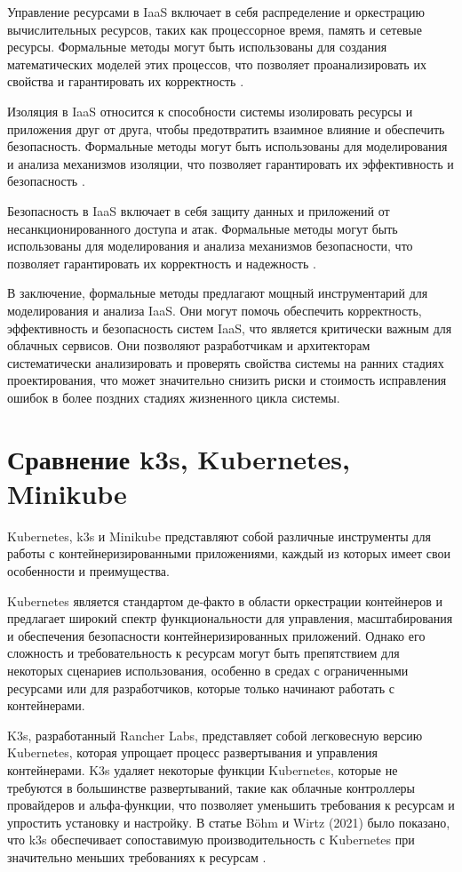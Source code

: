 Управление ресурсами в IaaS включает в себя распределение и
оркестрацию вычислительных ресурсов, таких как процессорное время,
память и сетевые ресурсы. Формальные методы могут быть использованы
для создания математических моделей этих процессов, что позволяет
проанализировать их свойства и гарантировать их корректность
\cite{de2012formal, turin2023predicting}.

Изоляция в IaaS относится к способности системы изолировать ресурсы и
приложения друг от друга, чтобы предотвратить взаимное влияние и
обеспечить безопасность. Формальные методы могут быть использованы
для моделирования и анализа механизмов изоляции, что позволяет
гарантировать их эффективность и безопасность \cite{bijon2014formal}.

Безопасность в IaaS включает в себя защиту данных и приложений от
несанкционированного доступа и атак. Формальные методы могут быть
использованы для моделирования и анализа механизмов безопасности,
что позволяет гарантировать их корректность и надежность
\cite{amato2018improving}.

В заключение, формальные методы предлагают мощный инструментарий для
моделирования и анализа IaaS. Они могут помочь обеспечить корректность,
эффективность и безопасность систем IaaS, что является критически важным
для облачных сервисов. Они позволяют разработчикам и архитекторам
систематически анализировать и проверять свойства системы на ранних
стадиях проектирования, что может значительно снизить риски и стоимость
исправления ошибок в более поздних стадиях жизненного цикла системы.

\section{Сравнение k3s, Kubernetes, Minikube}

Kubernetes, k3s и Minikube представляют собой различные инструменты
для работы с контейнеризированными приложениями, каждый из которых
имеет свои особенности и преимущества.

Kubernetes является стандартом де-факто в области оркестрации
контейнеров и предлагает широкий спектр функциональности для управления,
масштабирования и обеспечения безопасности контейнеризированных
приложений. Однако его сложность и требовательность к ресурсам могут
быть препятствием для некоторых сценариев использования, особенно в
средах с ограниченными ресурсами или для разработчиков, которые только
начинают работать с контейнерами.

K3s, разработанный Rancher Labs, представляет собой легковесную версию
Kubernetes, которая упрощает процесс развертывания и управления
контейнерами. K3s удаляет некоторые функции Kubernetes, которые
не требуются в большинстве развертываний, такие как облачные
контроллеры провайдеров и альфа-функции, что позволяет уменьшить
требования к ресурсам и упростить установку и настройку. В статье
Böhm и Wirtz (2021) было показано, что k3s обеспечивает
сопоставимую производительность с Kubernetes при значительно
меньших требованиях к ресурсам \cite{bohm2021profiling}.

